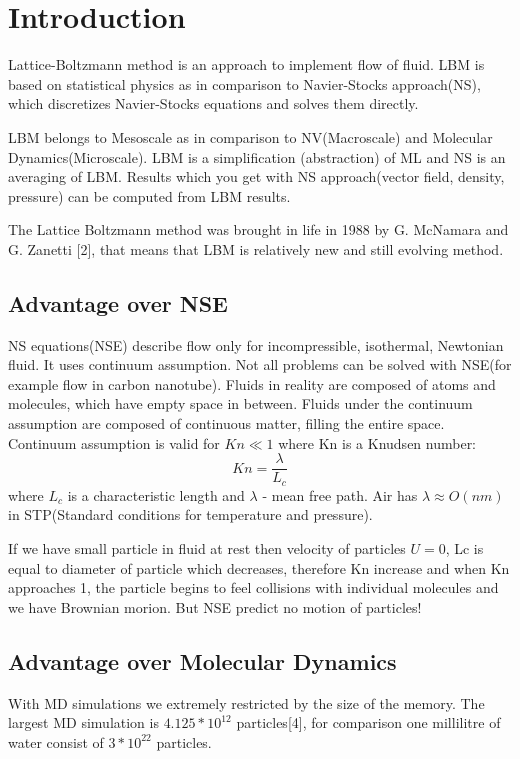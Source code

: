 
\section{Introduction}
Lattice-Boltzmann method is an approach to implement flow of fluid. LBM is based on statistical physics as in comparison to Navier-Stocks approach(NS), which discretizes Navier-Stocks equations and solves them directly.

LBM belongs to Mesoscale as in comparison to NV(Macroscale) and Molecular Dynamics(Microscale). LBM is a simplification (abstraction) of ML and NS is an averaging of LBM. Results which you get with NS approach(vector field, density, pressure) can be computed from LBM results.

The Lattice Boltzmann method was brought in life in 1988 by G. McNamara and G. Zanetti [2],  that means that LBM is relatively new and still evolving method.

\subsection{Advantage over NSE}

NS equations(NSE) describe flow only for incompressible, isothermal, Newtonian fluid. It uses continuum assumption. Not all problems can be solved with NSE(for example flow in carbon nanotube). Fluids in reality are composed of atoms and molecules, which have empty space in between. Fluids under the continuum assumption are composed of continuous matter, filling the entire space. Continuum assumption is valid for $Kn \ll 1$ where Kn is a Knudsen number:
\begin{equation}
Kn=\frac{\lambda}{L_c}
\end{equation}
where $L_c$ is a characteristic length and $\lambda$ - mean free path. Air has $\lambda \approx O(nm)$ in STP(Standard conditions for temperature and pressure).

If we have small particle in fluid at rest then velocity of particles $U=0$, Lc is equal to diameter of particle which decreases, therefore Kn increase and when Kn approaches 1, the particle begins to feel collisions with individual molecules and we have Brownian morion. But NSE predict no motion of particles!

\subsection{Advantage over Molecular Dynamics}
With MD simulations we extremely restricted by the size of the memory. The largest MD simulation is $4.125*10^{12}$ particles[4], for comparison one millilitre of water consist of $3*10^{22}$ particles.
